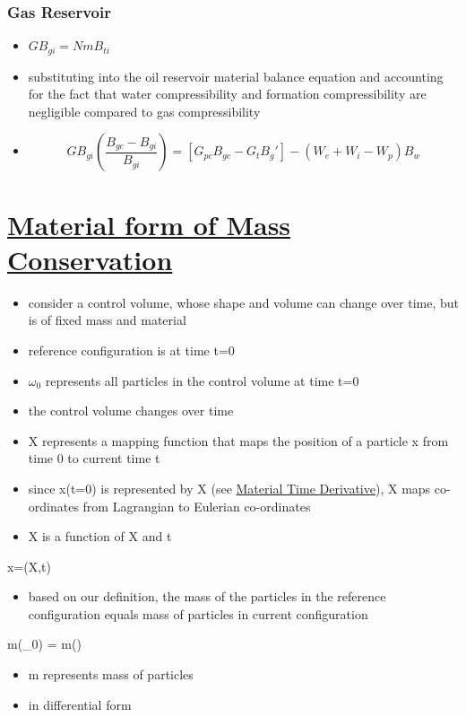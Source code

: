 \documentclass[11pt]{article}
\begin{document}
\subsubsection{Gas Reservoir}
\label{sec:org2d41eeb}
\begin{itemize}
\item \(G B_{gi} = N m B _{ti}\)
\item substituting into the oil reservoir material balance equation and accounting for the fact that water compressibility and formation compressibility are negligible compared to gas compressibility
\item $$G B_{gi} (\frac{B_{gc} - B_{gi}}{B_{gi}}) = [G _{pc} B _{gc} - G _t B _g'] - (W _e + W _i - W _p) B _w$$
\end{itemize}
\section{\href{materialtimederivative.org}{Material form of Mass Conservation}}
\label{sec:orgb968cfa}
\begin{itemize}
\item consider a control volume, whose shape and volume can change over time, but is of fixed mass and material
\item reference configuration is at time t=0
\item \(\omega_{\text{0}}\) represents all particles in the control volume at time t=0
\item the control volume changes over time
\item X represents a mapping function that maps the position of a particle x from time 0 to current time t
\item since x(t=0) is represented by X (see \href{materialtimederivative.org}{Material Time Derivative}), X maps co-ordinates from Lagrangian to Eulerian co-ordinates
\item X is a function of X and t
\end{itemize}
x=\Chi(X,t)
\begin{itemize}
\item based on our definition, the mass of the particles in the reference configuration equals mass of particles in current configuration
\end{itemize}
m(\omega_0) = m(\omega)
\begin{itemize}
\item m represents mass of particles
\item in differential form
\end{itemize}
\end{document}
